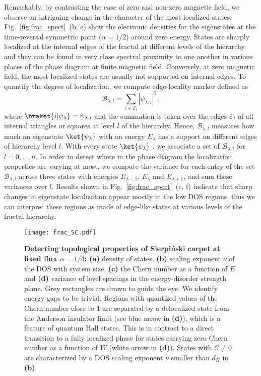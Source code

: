 {Remarkably, by contrasting the case of zero and non-zero magnetic field, we observe an intriguing change in the character of the most localized states. Fig.~\ref{fig:frac_spect}~(b, e) show the electronic densities for the eigenstates at the time-reversal symmetric point ($\alpha = 1/2$) around zero energy. States are sharply localized at the internal edges of the fractal at different levels of the hierarchy and they can be found in very close spectral proximity to one another in various places of the phase diagram at finite magnetic field. Conversely, at zero magnetic field, the most localized states are usually not supported on internal edges. To quantify the degree of localization, we compute edge-locality marker defined as
\begin{equation}
\mathcal{B}_{\lambda, l} = \sum_{i \in \mathcal{E}_l} | \psi_{\lambda,i} |^2, 
\label{eq:edgemarker}
\end{equation}
where $\braket{i | \psi_{\lambda}} = \psi_{\lambda,i} $ and the summation is taken over the edges $\mathcal{E}_l$ of all internal triangles or squares at level $l$ of the hierarchy. Hence, $\mathcal{B}_{\lambda, l}$ measures how much an eigenstate $\ket{\psi_{\lambda}}$ with an energy $E_{\lambda}$ has a support on different edges of hierarchy level $l$. With every state $\ket{\psi_{\lambda}}$ , we associate a set of $\mathcal{B}_{\lambda, l}$ for $l = 0, \ldots, n$. In order to detect where in the phase diagram the localization properties are varying at most, we compute the variance for each entry of the set $\mathcal{B}_{\lambda, l}$ across three states with energies $E_{\lambda - 1}$, $E_{\lambda}$ and $E_{\lambda+1}$, and sum these variances over $l$. Results shown in Fig.~\ref{fig:frac_spect}~(c, f) indicate that sharp changes in eigenstate localization appear mostly in the low DOS regions, thus we can interpret these regions as made of edge-like states at various levels of the fractal hierarchy.

\begin{figure}[h]
\centering
\texttt{[image: frac\_SC.pdf]} 
\caption{\textbf{Detecting topological properties of Sierpiński carpet at fixed flux $\alpha = 1/4$: (a)} density of states, \textbf{(b)} scaling exponent $\nu$ of the DOS with system size, \textbf{(c)} the Chern number as a function of $E$ and  \textbf{(d)} variance of level spacings in the energy-disorder strength plane. Grey rectangles are drawn to guide the eye. We identify energy gaps to be trivial. Regions with quantized values of the Chern number close to 1 are separated by a delocalized state from the Anderson insulator limit (see blue arrow in \textbf{(d)}), which is a feature of quantum Hall states. This is in contrast to a direct transition to a fully localized phase for states carrying zero Chern number as a function of $W$ (white arrow in \textbf{(d)}). States with $\mathcal{C} \neq 0$ are characterized by a DOS scaling exponent $\nu$ smaller than $d_{H}$ in \textbf{(b)}.}
\label{fig:frac_SC}
\end{figure}

}
